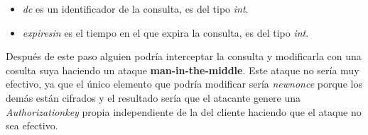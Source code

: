 \begin{enumerate}
\begin{itemize}
\begin{itemize}
			\item \emph{dc} es un identificador de la consulta, es del tipo \emph{int}.

			\item \emph{expires\textunderscore in} es el tiempo en el que expira la consulta, es del tipo \emph{int}.
		\end{itemize}
	\end{itemize}
	Después de este paso alguien podría interceptar la consulta y modificarla con una cosulta suya haciendo un ataque \textbf{man-in-the-middle}. 
	Este ataque no sería muy efectivo, ya que el único elemento que podría modificar sería \emph{new\textunderscore nonce} porque los demás están cifrados y el resultado sería que el atacante genere una \emph{Authorization\textunderscore key} propia independiente de la del cliente haciendo que el ataque no sea efectivo.


\end{enumerate}
